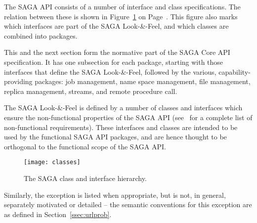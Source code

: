  \label{sec:nonfunc}
 
  The SAGA API consists of a number of interface and class
  specifications.  The relation between these is shown in
  Figure~\ref{fig:classes} on Page~\pageref{fig:classes}.  This
  figure also marks which interfaces are part
  of the SAGA Look-\&-Feel, and which classes are
  combined into packages.  
 
  This and the next section form the normative part of the SAGA
  Core API specification.  It has one subsection for each
  package, starting with those interfaces that define the SAGA
  Look-\&-Feel,
  followed by the various, capability-providing packages: job
  management, name space management, file management, replica
  management, streams, and remote procedure call.
 
  The SAGA Look-\&-Feel is defined by a number of
  classes and interfaces which ensure the non-functional
  properties of the SAGA API (see~\cite{saga-req} for a complete
  list of non-functional requirements).  These interfaces and
  classes are intended to be used by the functional SAGA API
  packages, and are hence thought to be orthogonal to the
  functional scope of the SAGA API.
 
  \begin{figure}[!ht]
  \begin{center}
     \up\up
     \texttt{[image: classes]}
     \caption{\label{fig:classes}\footnotesize The SAGA class 
              and interface hierarchy.\newline
              }
   \end{center}
  \end{figure}

      Similarly, the
   exception is listed when appropriate, but is not,
  in general, separately motivated or detailed -- the semantic
  conventions for this exception are as defined in
  Section~\ref{ssec:urlprob}.

 \clearpage
 
 
